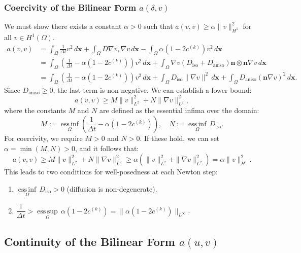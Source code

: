 \documentclass[12pt, a4paper, twoside, openright]{report}
\begin{document}
\subsubsection{Coercivity of the Bilinear Form $a(\delta, v)$}
We must show there exists a constant $\alpha     > 0$ such that $a(v,v) \ge \alpha \|v\|_{H^1}^2$ for all $v \in H^1(\Omega)$.
\begin{align*}
    a(v,v) &= \int_{\Omega} \frac{1}{\Delta t} v^2 \, d\mathbf{x} + \int_{\Omega} D \nabla v, \nabla v   \, d\mathbf{x} - \int_{\Omega} \alpha(1 - 2c^{(k)}) v^2 \, d\mathbf{x} \\
    &= \int_{\Omega} \left( \frac{1}{\Delta t} - \alpha(1 - 2c^{(k)}) \right) v^2 \, d\mathbf{x} + \int_{\Omega} \nabla v (D_{\text{iso}}+ D_{\text{aniso}}) \mathbf{n} \otimes \mathbf{n} \nabla v \, d\mathbf{x} \\
    &= \int_{\Omega} \left( \frac{1}{\Delta t} - \alpha(1 - 2c^{(k)}) \right) v^2 \, d\mathbf{x} + \int_{\Omega} D_{\text{iso}} \|\nabla v\|^2 \, d\mathbf{x} + \int_{\Omega} D_{\text{aniso}} (\mathbf{n} \nabla v)^2 \, d\mathbf{x}.
\end{align*}
Since $D_{\text{aniso}} \ge 0$, the last term is non-negative. We can establish a lower bound:
\[
a(v,v) \ge M \|v\|_{L^2}^2 + N \|\nabla v\|_{L^2}^2,
\]
where the constants $M$ and $N$ are defined as the essential infima over the domain:
\[
M := \underset{\Omega}{\operatorname{ess\,inf}} \left( \frac{1}{\Delta t} - \alpha(1 - 2c^{(k)}) \right), \quad N := \underset{\Omega}{\operatorname{ess\,inf}} \, D_{\text{iso}}.
\]
For coercivity, we require $M > 0$ and $N > 0$. If these hold, we can set $\alpha = \min(M, N) > 0$, and it follows that:
\[
a(v,v) \ge M \|v\|_{L^2}^2 + N \|\nabla v\|_{L^2}^2 \ge \alpha (\|v\|_{L^2}^2 + \|\nabla v\|_{L^2}^2) = \alpha \|v\|_{H^1}^2.
\]
This leads to two conditions for well-posedness at each Newton step:
\begin{enumerate}
    \item $\underset{\Omega}{\operatorname{ess\,inf}} \, D_{\text{iso}} > 0$ (diffusion is non-degenerate).
    \item $\dfrac{1}{\Delta t} > \underset{\Omega}{\operatorname{ess\,sup}} \, \alpha(1 - 2c^{(k)}) = \|\alpha(1 - 2c^{(k)})\|_{L^\infty}$.
\end{enumerate}

\subsection{Continuity of the Bilinear Form $a(u, v)$}
\end{document}
